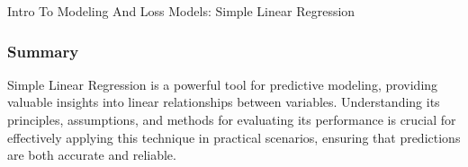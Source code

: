 \begin{notes}{Intro To Modeling And Loss Models: Simple Linear Regression}
    \subsubsection*{Summary}
    
    Simple Linear Regression is a powerful tool for predictive modeling, providing valuable insights into linear relationships between variables. Understanding its principles, assumptions, and methods 
    for evaluating its performance is crucial for effectively applying this technique in practical scenarios, ensuring that predictions are both accurate and reliable.    
\end{notes}